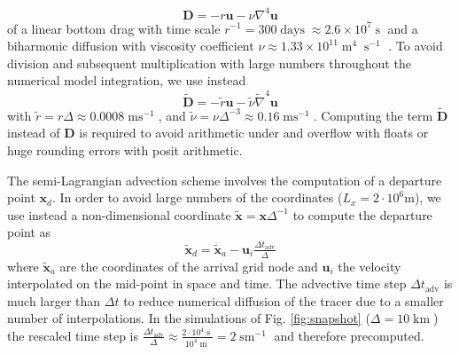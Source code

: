 \documentclass[draft]{agujournal2019}
\newcommand{\op}{\operatorname}
\begin{document}
\begin{equation}
\mathbf{D} = -r\mathbf{u} - \nu \nabla^4 \mathbf{u}
\end{equation}
of a linear bottom drag with time scale $r^{-1} = 300 \op{days} \approx 2.6 \times 10^7 \op{s}$ \cite{Arbic2008} and a biharmonic diffusion with viscosity coefficient $\nu \approx 1.33\times10^{11} \op{m}^4\op{s}^{-1}$ \cite{Griffies2000}. To avoid division and subsequent multiplication with large numbers throughout the numerical model integration, we use instead
\begin{equation}
\tilde{\mathbf{D}} = -\tilde{r}\mathbf{u} - \tilde{\nu}\tilde{\nabla}^4\mathbf{u}
\end{equation}
with $\tilde{r} = r\Delta \approx 0.0008\op{ms}^{-1}$,  and $\tilde{\nu} = \nu\Delta^{-3} \approx 0.16\op{ms}^{-1}$. Computing the term $\tilde{\mathbf{D}}$ instead of $\mathbf{D}$ is required to avoid arithmetic under and overflow with floats or huge rounding errors with posit arithmetic. 

The semi-Lagrangian advection scheme involves the computation of a departure point $\mathbf{x}_d$. In order to avoid large numbers of the coordinates ($L_x = 2 \cdot 10^6$m), we use instead a non-dimensional coordinate $\mathbf{\tilde{x}} = \mathbf{x}\Delta^{-1}$ to compute the departure point as 
\begin{equation}
\mathbf{\tilde{x}}_d = \mathbf{\tilde{x}}_a - \mathbf{u}_i \tfrac{\Delta t_\text{adv}}{\Delta}
\end{equation}
where $\mathbf{\tilde{x}}_a$ are the coordinates of the arrival grid node and $\mathbf{u}_i$ the velocity interpolated on the mid-point in space and time\cite{Smolarkiewicz1992}. The advective time step $\Delta t_\text{adv}$ is much larger than $\Delta t$ to reduce numerical diffusion of the tracer due to a smaller number of interpolations. In the simulations of Fig. \ref{fig:snapshot} ($\Delta = 10\op{km}$) the rescaled time step is $\tfrac{\Delta t_\text{adv}}{\Delta} \approx \tfrac{2 \cdot 10^4\op{s}}{10^4\op{m}} =  2 \op{sm}^{-1}$ and therefore precomputed.
\end{document}
